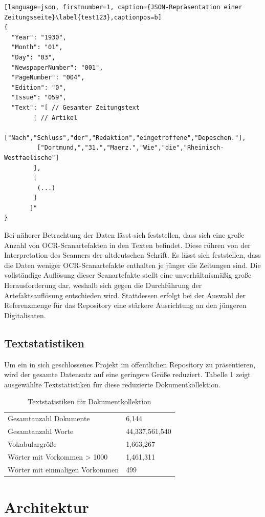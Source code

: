 \documentclass[11pt,a4paper, halfparskip]{scrartcl}
\begin{document}
\break

\begin{lstlisting}[language=json, firstnumber=1, caption={JSON-Repräsentation einer Zeitungsseite}\label{test123},captionpos=b]
{
  "Year": "1930",
  "Month": "01",
  "Day": "03",
  "NewspaperNumber": "001",
  "PageNumber": "004",
  "Edition": "0",
  "Issue": "059",
  "Text": "[ // Gesamter Zeitungstext
	    [ // Artikel
	     ["Nach","Schluss","der","Redaktion","eingetroffene","Depeschen."], 
	     ["Dortmund,","31.","Maerz.","Wie","die","Rheinisch-Westfaelische"] 
	    ], 
	    [
	     (...)
	    ] 
	   ]"
}
\end{lstlisting}

Bei näherer Betrachtung der Daten lässt sich feststellen, dass sich eine große Anzahl von OCR-Scanartefakten in den Texten befindet.
Diese rühren von der Interpretation des Scanners der altdeutschen Schrift.
Es lässt sich feststellen, dass die Daten weniger OCR-Scanartefakte enthalten je jünger die Zeitungen sind.
Die vollständige Auflösung dieser Scanartefakte stellt eine unverhältnismäßig große Herausforderung dar, weshalb sich gegen die Durchführung der Artefaktsauflösung entschieden wird. 
Stattdessen erfolgt bei der Auswahl der Referenzmenge für das Repository eine stärkere Ausrichtung an den jüngeren Digitalisaten. 

\subsection{Textstatistiken}
Um ein in sich geschlossenes Projekt im öffentlichen Repository zu präsentieren, wird der gesamte Datensatz auf eine geringere Größe reduziert.
Tabelle 1 zeigt ausgewählte Textstatistiken für diese reduzierte Dokumentkollektion.

\begin{table}[h!]
	\centering
	\begin{tabularx}{0.8\textwidth}{lX}
		\hline
		Gesamtanzahl Dokumente & 6,144\\
		Gesamtanzahl Worte & 44,337,561,540 \\
		Vokabulargröße & 1,663,267 \\
		Wörter mit Vorkommen > 1000 & 1,461,311 \\
		Wörter mit einmaligen Vorkommen & 499 \\
		\hline
	\end{tabularx}
	\caption{Textstatistiken für Dokumentkollektion}
\end{table}

\section{Architektur}
\end{document}
